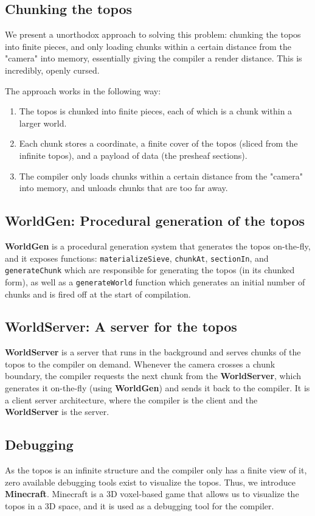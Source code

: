 \documentclass[11pt]{article}
\begin{document}
\subsection{Chunking the topos}
We present a unorthodox approach to solving this problem: chunking the topos into finite pieces, and only loading chunks within a certain
distance from the "camera" into memory, essentially giving the compiler a render distance. This is incredibly, openly cursed.

The approach works in the following way:
\begin{enumerate}
    \item The topos is chunked into finite pieces, each of which is a chunk within a larger world.
    \item Each chunk stores a coordinate, a finite cover of the topos (sliced from the infinite topos), and a payload of data (the presheaf sections).
    \item The compiler only loads chunks within a certain distance from the "camera" into memory, and unloads chunks that are too far away.
\end{enumerate}

\subsection{WorldGen: Procedural generation of the topos}
\textbf{WorldGen} is a procedural generation system that generates the topos on-the-fly, and it exposes functions:
\texttt{materializeSieve}, \texttt{chunkAt}, \texttt{sectionIn}, and \texttt{generateChunk} which are responsible for generating the topos (in its chunked form),
as well as a \texttt{generateWorld} function which generates an initial number of chunks and is fired off at the start of compilation.

\subsection{WorldServer: A server for the topos}
\textbf{WorldServer} is a server that runs in the background and serves chunks of the topos to the compiler on demand.
Whenever the camera crosses a chunk boundary, the compiler requests the next chunk from the \textbf{WorldServer}, which generates it on-the-fly (using \textbf{WorldGen}) and
sends it back to the compiler. It is a client server architecture, where the compiler is the client and the \textbf{WorldServer} is the server.

\subsection{Debugging}
As the topos is an infinite structure and the compiler only has a finite view of it, zero available debugging tools exist to visualize the topos.
Thus, we introduce \textbf{Minecraft}. Minecraft is a 3D voxel-based game that allows us to visualize the topos in a 3D space, and it is used as a debugging tool
for the compiler.
\end{document}
